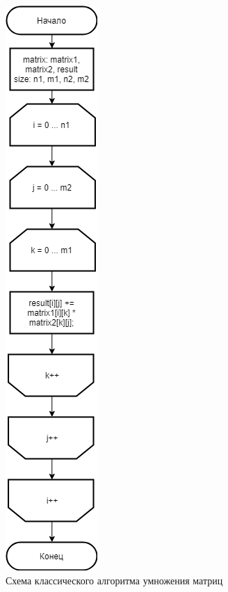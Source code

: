 \documentclass[12pt]{report}
\begin{document}
\begin{figure}[!htbp]
\centering
\includegraphics[scale=0.7]{SchemeStand}
\caption{Схема классического алгоритма умножения матриц}
\label{fig:mpr}
\end{figure}
\end{document}
